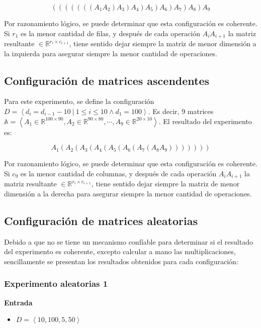 \documentclass[letter]{article}
\begin{document}
\[ (((((((A_1A_2)A_3)A_4)A_5)A_6)A_7)A_8)A_9 \]

Por razonamiento lógico, se puede determinar que esta configuración es coherente. Si $r_1$ es la menor cantidad de filas, y después de cada operación $A_i A_{i+1}$ la matriz resultante $\in \mathbb{R}^{r_i \times c_{i+1}}$, tiene sentido dejar siempre la matriz de menor dimensión a la izquierda para asegurar siempre la menor cantidad de operaciones. \par

\subsection{Configuración de matrices ascendentes}

Para este experimento, se define la configuración $D = \left< d_i = d_{i - 1} - 10 ~|~ 1 \leq i \leq 10 \land d_1 = 100 \right>$. Es decir, 9 matrices $\mathbb{A} = \left< A_1 \in \mathbb{R}^{100 \times 90}, A_2 \in \mathbb{R}^{90 \times 80}, \cdots, A_9 \in \mathbb{R}^{20 \times 10} \right>$. El resultado del experimento es: \par

\[ A_1(A_2(A_3(A_4(A_5(A_6(A_7(A_8A_9))))))) \]

Por razonamiento lógico, se puede determinar que esta configuración es coherente. Si $c_9$ es la menor cantidad de columnas, y después de cada operación $A_i A_{i+1}$ la matriz resultante $\in \mathbb{R}^{r_i \times c_{i+1}}$, tiene sentido dejar siempre la matriz de menor dimensión a la derecha para asegurar siempre la menor cantidad de operaciones. \par

\subsection{Configuración de matrices aleatorias}

Debido a que no se tiene un mecanismo confíable para determinar si el resultado del experimento es coherente, excepto calcular a mano las multiplicaciones, sencillamente se presentan los resultados obtenidos para cada configuración: \par

\subsubsection{Experimento aleatorias 1}

\textbf{Entrada}

\begin{itemize}
    \item $D = \left< 10,100,5,50 \right>$
\end{itemize}
\end{document}
